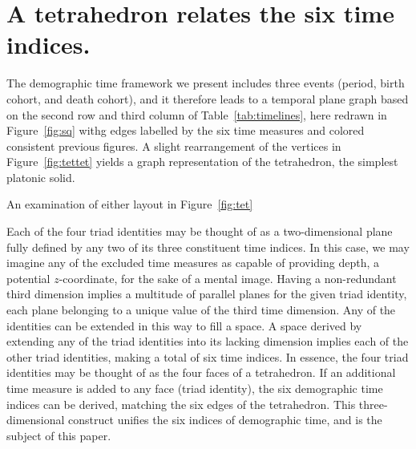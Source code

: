 \documentclass[12pt,oneside,a4paper]{article} %
\theoremstyle{definition}
\begin{document}

\FloatBarrier
\section{A tetrahedron relates the six time indices.}
\label{sec:tetrahedron}
The demographic time framework we present includes three events (period, birth
cohort, and death cohort), and it therefore leads to a temporal plane graph
based on the second row and third column of Table~\ref{tab:timelines}, here
redrawn in Figure~\ref{fig:sq} withg edges labelled by the six time measures
and colored consistent previous figures. A slight rearrangement of the vertices
in Figure~\ref{fig:tettet} yields a graph representation of the tetrahedron, the
simplest platonic solid.

An examination of either layout in Figure~\ref{fig:tet}

Each of the four triad identities may be thought of as a
two-dimensional plane fully defined by any two of its three constituent time
indices.
In this case, we may imagine any of the excluded time measures as capable of
providing depth, a potential $z$-coordinate, for the sake of a mental image.
Having a non-redundant third dimension implies a multitude of parallel planes
for the given triad identity, each plane belonging to a unique value of the
third time dimension. Any of the identities can be extended in this way to fill a space. A space derived by
extending any of the triad identities into its lacking dimension implies each of
the other triad identities, making a total of six time indices. In essence, the
four triad identities may be thought of as the four faces of a
tetrahedron. If an additional time measure is added to any face (triad
identity), the six demographic time indices can be derived, matching the six edges of the tetrahedron. This three-dimensional construct unifies the six indices of demographic time, and is the subject of this paper.
\end{document}
